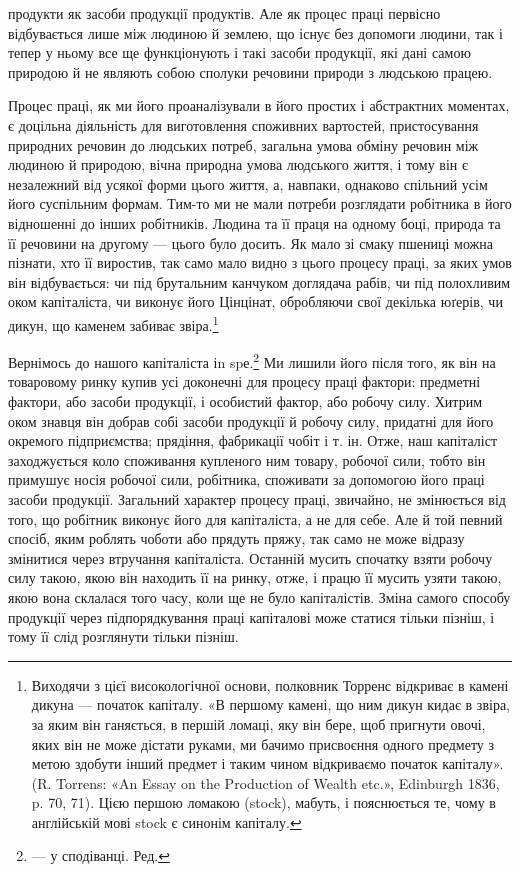 продукти як засоби продукції продуктів. Але як процес праці
первісно відбувається лише між людиною й землею, що існує
без допомоги людини, так і тепер у ньому все ще функціонують
і такі засоби продукції, які дані самою природою й не являють
собою сполуки речовини природи з людською працею.

Процес праці, як ми його проаналізували в його простих і абстрактних
моментах, є доцільна діяльність для виготовлення
споживних вартостей, пристосування природних речовин до
людських потреб, загальна умова обміну речовин між людиною
й природою, вічна природна умова людського життя, і тому він
є незалежний від усякої форми цього життя, а, навпаки, однаково
спільний усім його суспільним формам. Тим-то ми не мали
потреби розглядати робітника в його відношенні до інших робітників.
Людина та її праця на одному боці, природа та її речовини
на другому — цього було досить. Як мало зі смаку пшениці
можна пізнати, хто її виростив, так само мало видно з цього процесу
праці, за яких умов він відбувається: чи під брутальним
канчуком доглядача рабів, чи під полохливим оком капіталіста,
чи виконує його Цінцінат, обробляючи свої декілька юґерів,
чи дикун, що каменем забиває звіра.\footnote{
Виходячи з цієї високологічної основи, полковник Торренс відкриває
в камені дикуна — початок капіталу. «В першому камені, що ним
дикун кидає в звіра, за яким він ганяється, в першій ломаці, яку він бере,
щоб пригнути овочі, яких він не може дістати руками, ми бачимо присвоєння
одного предмету з метою здобути інший предмет і таким чином
відкриваємо початок капіталу». (R. Torrens: «An Essay on the
Production of Wealth etc.», Edinburgh 1836, p. 70, 71). Цією першою
ломакою (stock), мабуть, і пояснюється те, чому в англійській мові stock
є синонім капіталу.
}

Вернімось до нашого капіталіста іn spе.\footnote*{
— у сподіванці. Ред.
} Ми лишили його
після того, як він на товаровому ринку купив усі доконечні
для процесу праці фактори: предметні фактори, або засоби продукції,
і особистий фактор, або робочу силу. Хитрим оком знавця
він добрав собі засоби продукції й робочу силу, придатні для
його окремого підприємства; прядіння, фабрикації чобіт і т. ін.
Отже, наш капіталіст заходжується коло споживання купленого
ним товару, робочої сили, тобто він примушує носія робочої сили,
робітника, споживати за допомогою його праці засоби продукції.
Загальний характер процесу праці, звичайно, не змінюється від
того, що робітник виконує його для капіталіста, а не для себе.
Але й той певний спосіб, яким роблять чоботи або прядуть пряжу,
так само не може відразу змінитися через втручання капіталіста.
Останній мусить спочатку взяти робочу силу такою, якою він
находить її на ринку, отже, і працю її мусить узяти такою, якою
вона склалася того часу, коли ще не було капіталістів. Зміна
самого способу продукції через підпорядкування праці капіталові
може статися тільки пізніш, і тому її слід розглянути
тільки пізніш.